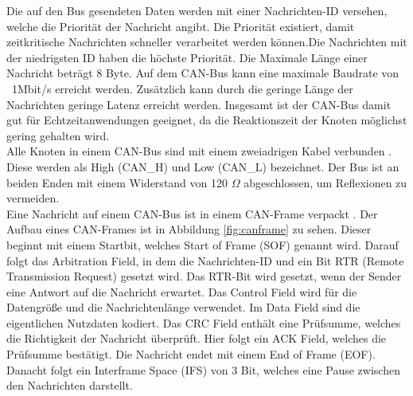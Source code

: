 Die auf den Bus gesendeten Daten werden mit einer Nachrichten-ID
versehen, welche die Priorität der Nachricht angibt. Die Priorität existiert, damit zeitkritische Nachrichten
schneller verarbeitet werden können.Die Nachrichten mit der niedrigsten ID haben die höchste Priorität.
Die Maximale Länge einer Nachricht beträgt 8 Byte. 
Auf dem CAN-Bus kann eine maximale Baudrate von \ 1Mbit/s erreicht werden.
Zusätzlich kann durch die geringe Länge der Nachrichten geringe Latenz erreicht werden. 
Insgesamt ist der CAN-Bus damit gut für Echtzeitanwendungen geeignet, da die Reaktionszeit der Knoten möglichst gering gehalten wird.
\\
Alle Knoten in einem CAN-Bus sind mit einem zweiadrigen Kabel verbunden \cite[Seite 132]{Voss2008}. 
Diese werden als High (CAN\_H) und Low (CAN\_L) 
bezeichnet. Der Bus ist an beiden Enden mit einem Widerstand von 120 $\Omega$ abgeschlossen, um Reflexionen zu vermeiden.
\\
Eine Nachricht auf einem CAN-Bus ist in einem CAN-Frame verpackt \cite[Seite 36]{Voss2008}. 
Der Aufbau eines CAN-Frames ist in Abbildung \ref{fig:canframe} zu sehen.
Dieser beginnt mit einem Startbit, welches Start of Frame (SOF) genannt wird. Darauf folgt das Arbitration Field, 
in dem die Nachrichten-ID und ein Bit RTR (Remote Transmission Request) gesetzt wird. Das RTR-Bit wird gesetzt,
wenn der Sender eine Antwort auf die Nachricht erwartet. Das Control Field wird für die Datengröße und die Nachrichtenlänge
verwendet. Im Data Field sind die eigentlichen Nutzdaten kodiert. Das CRC Field enthält eine Prüfsumme, welches die Richtigkeit
der Nachricht überprüft. Hier folgt ein ACK Field, welches die Prüfsumme bestätigt. Die Nachricht endet mit einem End of Frame (EOF).
Danacht folgt ein Interframe Space (IFS) von 3 Bit, welches eine Pause zwischen den Nachrichten darstellt.

